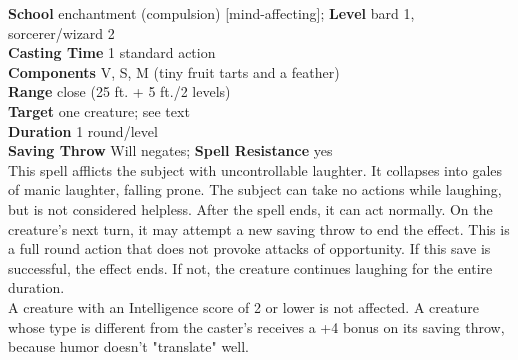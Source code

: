 \textbf{School} enchantment (compulsion) [mind-affecting]; \textbf{Level} bard 1, sorcerer/wizard 2\\
\textbf{Casting Time} 1 standard action\\
\textbf{Components} V, S, M (tiny fruit tarts and a feather)\\
\textbf{Range} close (25 ft. + 5 ft./2 levels)\\
\textbf{Target} one creature; see text\\
\textbf{Duration} 1 round/level\\
\textbf{Saving Throw }Will negates; \textbf{Spell Resistance} yes\\
This spell afflicts the subject with uncontrollable laughter. It collapses into gales of manic laughter, falling prone. The subject can take no actions while laughing, but is not considered helpless. After the spell ends, it can act normally. On the creature's next turn, it may attempt a new saving throw to end the effect. This is a full round action that does not provoke attacks of opportunity. If this save is successful, the effect ends. If not, the creature continues laughing for the entire duration.\\
A creature with an Intelligence score of 2 or lower is not affected. A creature whose type is different from the caster's receives a +4 bonus on its saving throw, because humor doesn't "translate" well.\\
